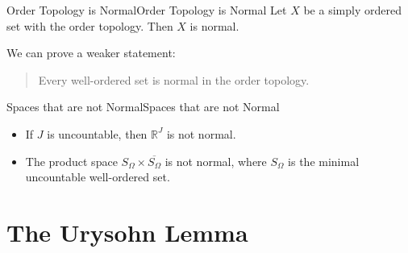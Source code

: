 \documentclass[../main.tex]{subfiles}
\begin{document}
\begin{theorem}{Order Topology is Normal}{Order Topology is Normal}
Let $X$ be a simply ordered set with the order topology. Then $X$ is normal.
\end{theorem}

We can prove a weaker statement:
\begin{quote}
	Every well-ordered set is normal in the order topology.
\end{quote}

\begin{example}{Spaces that are not Normal}{Spaces that are not Normal}
\begin{itemize}
\item If $J$ is uncountable, then $\mathbb{R}^J$ is not normal.
\item The product space $S_{\Omega} \times \overline{S_{\Omega}}$ is not normal, where $S_{\Omega}$ is the minimal uncountable well-ordered set.
\end{itemize}
\end{example}

\section{The Urysohn Lemma}
\end{document}
